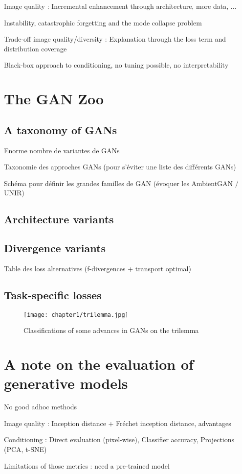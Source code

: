 Image quality : Incremental enhancement through architecture, more data, ... 

Instability, catastrophic forgetting and the mode collapse problem

Trade-off image quality/diversity : Explanation through the loss term and distribution coverage

Black-box approach to conditioning, no tuning possible, no interpretability

\section{The GAN Zoo}

\subsection{A taxonomy of GANs}
Enorme nombre de variantes de GANs

Taxonomie des approches GANs (pour s'éviter une liste des différents GANs)

Schéma pour définir les grandes familles de GAN (évoquer les AmbientGAN / UNIR)

\subsection{Architecture variants}

\subsection{Divergence variants}
Table des loss alternatives (f-divergences + transport optimal)

\subsection{Task-specific losses}

\begin{figure}
	\texttt{[image: chapter1/trilemma.jpg]}
	\caption{Classifications of some advances in GANs on the trilemma}
\end{figure}

\section{A note on the  evaluation of generative models}

No good adhoc methods

Image quality : Inception distance + Fréchet inception distance, advantages

Conditioning : Direct evaluation (pixel-wise), Classifier accuracy, Projections (PCA, t-SNE)

Limitations of those metrics : need a pre-trained model


